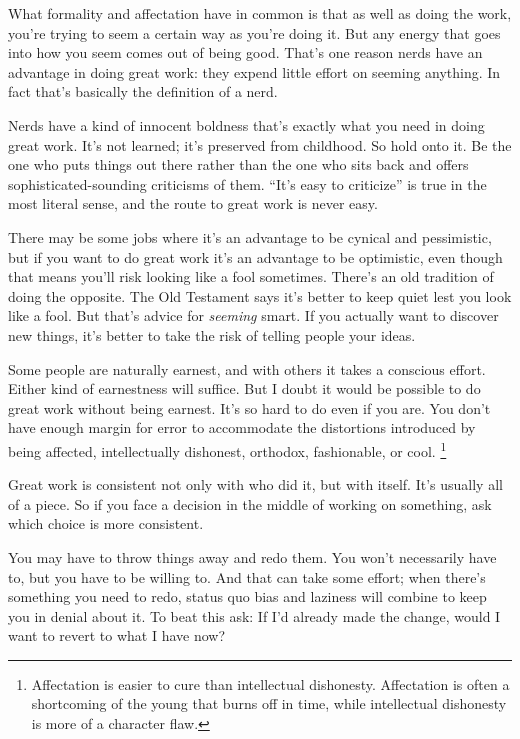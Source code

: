 \documentclass[12pt]{book}
\begin{document}
What formality and affectation have in common is that as well as doing
the work, you're trying to seem a certain way as you're doing it. But
any energy that goes into how you seem comes out of being good. That's
one reason nerds have an advantage in doing great work: they expend
little effort on seeming anything. In fact that's basically the
definition of a nerd.

Nerds have a kind of innocent boldness that's exactly what you need in
doing great work. It's not learned; it's preserved from childhood. So
hold onto it. Be the one who puts things out there rather than the one
who sits back and offers sophisticated-sounding criticisms of them.
``It's easy to criticize'' is true in the most literal sense, and the
route to great work is never easy.

There may be some jobs where it's an advantage to be cynical and
pessimistic, but if you want to do great work it's an advantage to be
optimistic, even though that means you'll risk looking like a fool
sometimes. There's an old tradition of doing the opposite. The Old
Testament says it's better to keep quiet lest you look like a fool. But
that's advice for \emph{seeming} smart. If you actually want to discover
new things, it's better to take the risk of telling people your ideas.

Some people are naturally earnest, and with others it takes a conscious
effort. Either kind of earnestness will suffice. But I doubt it would be
possible to do great work without being earnest. It's so hard to do even
if you are. You don't have enough margin for error to accommodate the
distortions introduced by being affected, intellectually dishonest,
orthodox, fashionable, or cool. \footnote{Affectation is easier to cure than intellectual dishonesty.
Affectation is often a shortcoming of the young that burns off in time,
while intellectual dishonesty is more of a character flaw.}

Great work is consistent not only with who did it, but with itself. It's
usually all of a piece. So if you face a decision in the middle of
working on something, ask which choice is more consistent.

You may have to throw things away and redo them. You won't necessarily
have to, but you have to be willing to. And that can take some effort;
when there's something you need to redo, status quo bias and laziness
will combine to keep you in denial about it. To beat this ask: If I'd
already made the change, would I want to revert to what I have now?
\end{document}
